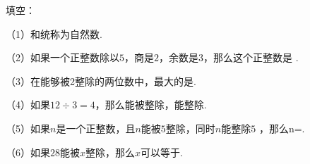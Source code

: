 填空：

（1）\key{\hspace{4em}}和\key{\hspace{4em}}统称为自然数.

（2）如果一个正整数除以$5$，商是$2$，余数是$3$，那么这个正整数是 \key{\hspace{4em}}.

（3）在能够被2整除的两位数中，最大的是\key{\hspace{4em}}.

（4）如果$12\div3=4$，那么\key{\hspace{4em}}能被\key{\hspace{4em}}整除，\key{\hspace{4em}}能整除\key{\hspace{4em}}.

（5）如果$n$是一个正整数，且$n$能被$5$整除，同时$n$能整除$5$ ，那么n=\key{\hspace{4em}}.

（6）如果$28$能被$x$整除，那么$x$可以等于\key{\hspace{4em}}.